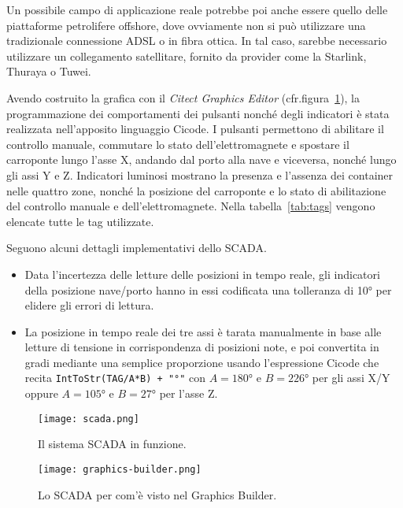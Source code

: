 Un possibile campo di applicazione reale potrebbe poi anche essere quello delle piattaforme
petrolifere offshore, dove ovviamente non si può utilizzare una tradizionale connessione ADSL o in
fibra ottica. In tal caso, sarebbe necessario utilizzare un collegamento satellitare, fornito da
provider come la Starlink, Thuraya o Tuwei.

Avendo costruito la grafica con il \emph{Citect Graphics Editor} (cfr.\@ figura~\ref{fig:scada}), la
programmazione dei comportamenti dei pulsanti nonché degli indicatori è stata realizzata
nell'apposito linguaggio Cicode. I pulsanti permettono di abilitare il controllo manuale, commutare
lo stato dell'elettromagnete e spostare il carroponte lungo l'asse X, andando dal porto alla nave e
viceversa, nonché lungo gli assi Y e Z. Indicatori luminosi mostrano la presenza e l'assenza dei
container nelle quattro zone, nonché la posizione del carroponte e lo stato di abilitazione del
controllo manuale e dell'elettromagnete. Nella tabella~\ref{tab:tags} vengono elencate tutte le tag
utilizzate.

Seguono alcuni dettagli implementativi dello SCADA.
\begin{itemize}
    \item Data l'incertezza delle letture delle posizioni in tempo reale, gli indicatori della
        posizione nave/porto hanno in essi codificata una tolleranza di \ang{10} per elidere gli
        errori di lettura.
    \item La posizione in tempo reale dei tre assi è tarata manualmente in base alle letture di
        tensione in corrispondenza di posizioni note, e poi convertita in gradi mediante una
        semplice proporzione usando l'espressione Cicode che recita
        {\small\texttt{IntToStr(TAG/A*B) + "°"}} con $A = \ang{180}$ e $B = \ang{226}$ per
        gli assi X/Y oppure $A = \ang{105}$ e $B = \ang{27}$ per l'asse Z.
\end{itemize}

\begin{figure}[htbp]\centering
    \caption{Il sistema SCADA in funzione.}\label{fig:scada}
    \texttt{[image: scada.png]}
\end{figure}

\begin{figure}[htbp]\centering
    \caption{Lo SCADA per com'è visto nel Graphics Builder.}\label{fig:scada-builder}
    \texttt{[image: graphics-builder.png]}
\end{figure}

